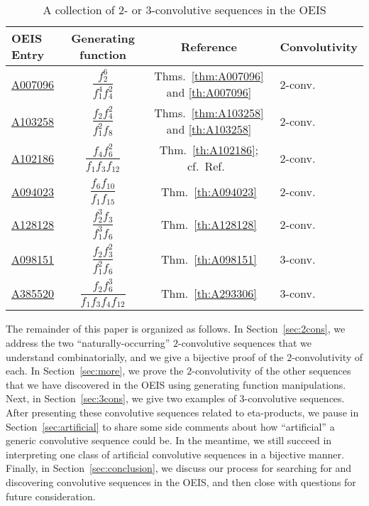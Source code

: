 \documentclass[12pt,reqno]{amsart}
\numberwithin{equation}{section}
\theoremstyle{plain}
\theoremstyle{definition}
\theoremstyle{named}
\begin{document}
\begin{table}[ht]
	\renewcommand{\arraystretch}{2.4} %
	\caption{A collection of $2$- or $3$-convolutive sequences in the OEIS}\label{tab:list}
	\begin{center}
		\begin{tabularx}{\textwidth}{@{}>{\centering\arraybackslash}X|c|c|>{\centering\arraybackslash}X@{}} 
			\hline
			OEIS Entry & Generating function & Reference & Convolutivity\\
			\hline
			\href{https://oeis.org/A007096}{A007096} & $\dfrac{f_2^6}{f_1^4f_4^2}$ & Thms.~\ref{thm:A007096} and \ref{th:A007096} & $2$-conv.\\
			\href{https://oeis.org/A103258}{A103258} & $\dfrac{f_2f_4^2}{f_1^2f_8}$ & Thms.~\ref{thm:A103258} and \ref{th:A103258} & $2$-conv.\\
			\href{https://oeis.org/A102186}{A102186} & $\dfrac{f_4f_6^2}{f_1f_3f_{12}}$ & Thm.~\ref{th:A102186}; cf.~Ref.~\cite{ALL2002} & $2$-conv.\\
			\href{https://oeis.org/A094023}{A094023} & $\dfrac{f_6f_{10}}{f_1f_{15}}$ & Thm.~\ref{th:A094023} & $2$-conv.\\
			\href{https://oeis.org/A128128}{A128128} & $\dfrac{f_2^3f_{3}}{f_1^3f_{6}}$ & Thm.~\ref{th:A128128} & $2$-conv.\\
			\href{https://oeis.org/A098151}{A098151} & $\dfrac{f_2f_3^2}{f_1^2f_6}$ & Thm.~\ref{th:A098151} & $3$-conv.\\
			\href{https://oeis.org/A385520}{A385520} & $\dfrac{f_2f_6^3}{f_1f_3f_4f_{12}}$ & Thm.~\ref{th:A293306} & $3$-conv.\\[10pt]
			\hline
		\end{tabularx}
	\end{center}
\end{table}

The remainder of this paper is organized as follows. In Section~\ref{sec:2cons}, we address the two ``naturally-occurring'' $2$-convolutive sequences that we understand combinatorially, and we give a bijective proof of the $2$-convolutivity of each. In Section~\ref{sec:more}, we prove the $2$-convolutivity of the other sequences that we have discovered in the OEIS using generating function manipulations. Next, in Section~\ref{sec:3cons}, we give two examples of $3$-convolutive sequences. After presenting these convolutive sequences related to eta-products, we pause in Section~\ref{sec:artificial} to share some side comments about how ``artificial'' a generic convolutive sequence could be. In the meantime, we still succeed in interpreting one class of artificial convolutive sequences in a bijective manner. Finally, in Section~\ref{sec:conclusion}, we discuss our process for searching for and discovering convolutive sequences in the OEIS, and then close with questions for future consideration.
\end{document}
